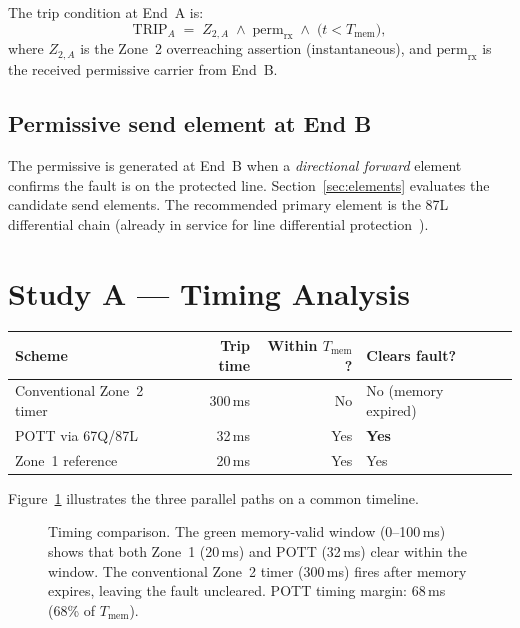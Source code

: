 \documentclass[11pt,a4paper]{article}
\begin{document}
\noindent
The trip condition at End~A is:
\begin{equation}
  \mathrm{TRIP}_A \;=\; Z_{2,A} \;\wedge\; \mathrm{perm}_\mathrm{rx} \;\wedge\;
  \bigl(t < T_\mathrm{mem}\bigr),
  \label{eq:trip_cond}
\end{equation}
where $Z_{2,A}$ is the Zone~2 overreaching assertion (instantaneous), and
$\mathrm{perm}_\mathrm{rx}$ is the received permissive carrier from End~B.

\subsection{Permissive send element at End B}

The permissive is generated at End~B when a \emph{directional forward} element
confirms the fault is on the protected line.  Section~\ref{sec:elements}
evaluates the candidate send elements.  The recommended primary element is the
87L differential chain (already in service for line differential protection~\cite{SAMBP_TR27}).

\section{Study A --- Timing Analysis}
\label{sec:timing}

\begin{center}
\begin{tabular}{@{}lrrll@{}}
\toprule
Scheme & Trip time & Within $T_\mathrm{mem}$? & Clears fault?\\
\midrule
Conventional Zone~2 timer & 300\,ms & No  & No (memory expired)\\
POTT via 67Q/87L          &  32\,ms & Yes & \textbf{Yes} \\
\midrule
Zone~1 reference          &  20\,ms & Yes & Yes\\
\bottomrule
\end{tabular}
\end{center}

\medskip
Figure~\ref{fig:timing} illustrates the three parallel paths on a common timeline.

\begin{figure}[htbp]
  \centering
  \resizebox{0.90\textwidth}{!}{%
  }
  \caption{Timing comparison.  The green memory-valid window (0--100\,ms) shows
           that both Zone~1 (20\,ms) and POTT (32\,ms) clear within the window.
           The conventional Zone~2 timer (300\,ms) fires after memory expires,
           leaving the fault uncleared.  POTT timing margin: 68\,ms (68\% of
           $T_\mathrm{mem}$).}
  \label{fig:timing}
\end{figure}
\end{document}
